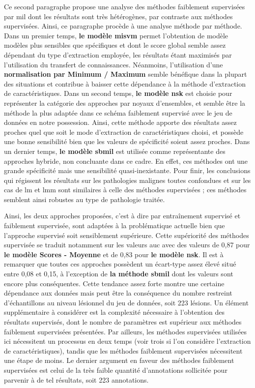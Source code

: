 Ce second paragraphe propose une analyse des méthodes faiblement supervisées par \gls{mil} dont les résultats sont très hétérogènes, par contraste aux méthodes supervisées. Ainsi, ce paragraphe procède à une analyse méthode par méthode. Dans un premier temps, \textbf{le modèle \gls{misvm}} permet l'obtention de modèle modèles plus sensibles que spécifiques et dont le score global semble assez dépendant du type d'extraction employée, les résultats étant maximisés par l'utilisation du transfert de connaissances. Néanmoins, l'utilisation d'une \textbf{normalisation par Minimum / Maximum} semble bénéfique dans la plupart des situations et contribue à baisser cette dépendance à la méthode d'extraction de caractéristiques. Dans un second temps, \textbf{le modèle \gls{nsk}} est choisie pour représenter la catégorie des approches par noyaux d'ensembles, et semble être la méthode la plus adaptée dans ce schéma faiblement supervisé avec le jeu de données en notre possession. Ainsi, cette méthode apporte des résultats assez proches quel que soit le mode d'extraction de caractéristiques choisi, et possède une bonne sensibilité bien que les valeurs de spécificité soient assez proches. Dans un dernier temps, \textbf{le modèle \gls{sbmil}} est utilisée comme représentante des approches hybride, non concluante dans ce cadre. En effet, ces méthodes ont une grande spécificité mais une sensibilité quasi-inexistante. Pour finir, les conclusions qui régissent les résultats sur les pathologies malignes toutes confondues et sur les cas de \gls{lm} et \gls{lmm} sont similaires à celle des méthodes supervisées ; ces méthodes semblent ainsi robustes au type de pathologie traitée.\par

Ainsi, les deux approches proposées, c'est à dire par entraînement supervisé et faiblement supervisée, sont adaptées à la problématique actuelle bien que l'approche supervisé soit sensiblement supérieure. Cette supériorité des méthodes supervisée se traduit notamment sur les valeurs \gls{auc} avec des valeurs de 0,87 pour \textbf{le modèle Scores - Moyenne} et de 0,83 pour \textbf{le modèle \gls{nsk}}. Il est à remarquer que toutes ces approches possèdent un écart-type assez élevé situé entre 0,08 et 0,15, à l'exception de \textbf{la méthode \gls{sbmil}} dont les valeurs sont encore plus conséquentes. Cette tendance assez forte montre une certaine dépendance aux données mais peut être la conséquence du nombre restreint d'échantillons au niveau lésionnel du jeu de données, soit 223 lésions. Un élément supplémentaire à considérer est la complexité nécessaire à l'obtention des résultats supervisés, dont le nombre de paramètres est supérieur aux méthodes faiblement supervisées présentées. Par ailleurs, les méthodes supervisées utilisées ici nécessitent un processus en deux temps (voir trois si l'on considère l'extraction de caractéristiques), tandis que les méthodes faiblement supervisées nécessitent une étape de moins. Le dernier argument en faveur des méthodes faiblement supervisées est celui de la très faible quantité d'annotations sollicitée pour parvenir à de tel résultats, soit 223 annotations.\par

